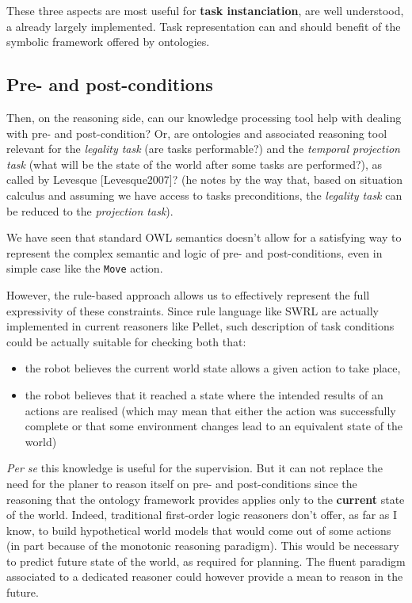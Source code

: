 These three aspects are most useful for {\bf task instanciation}, are well
understood, a already largely implemented. Task representation can and should
benefit of the symbolic framework offered by ontologies.


\subsection{Pre- and post-conditions}

Then, on the reasoning side, can our knowledge processing tool help with
dealing with pre- and post-condition? Or, are ontologies and associated
reasoning tool relevant for the \emph{legality task} (are tasks performable?)
and the \emph{temporal projection task} (what will be the state of the world
after some tasks are performed?), as called by Levesque [Levesque2007]? (he
notes by the way that, based on situation calculus and assuming we have access
to tasks preconditions, the \emph{legality task} can be reduced to the
\emph{projection task}).

We have seen that standard OWL semantics doesn't allow for a satisfying way to
represent the complex semantic and logic of pre- and post-conditions, even in
simple case like the {\tt Move} action.

However, the rule-based approach allows us to effectively represent the full
expressivity of these constraints. Since rule language like SWRL are actually
implemented in current reasoners like Pellet, such description of task
conditions could be actually suitable for checking both that:


\begin{itemize}

\item  the robot believes the current world state allows a given action to take
place,

\item  the robot believes that it reached a state where the intended results of
an actions are realised (which may mean that either the action was successfully
complete or that some environment changes lead to an equivalent state of the
world)

\end{itemize}

\emph{Per se} this knowledge is useful for the supervision. But it can not
replace the need for the planer to reason itself on pre- and post-conditions
since the reasoning that the ontology framework provides applies only to the
{\bf current} state of the world. Indeed, traditional first-order logic
reasoners don't offer, as far as I know, to build hypothetical world models
that would come out of some actions (in part because of the monotonic reasoning
paradigm). This would be necessary to predict future state of the world, as
required for planning. The fluent paradigm associated to a dedicated reasoner
could however provide a mean to reason in the future.

